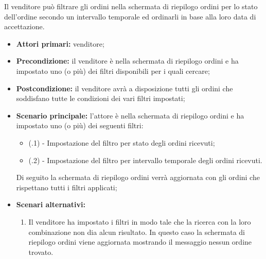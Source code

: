 Il venditore può filtrare gli ordini nella schermata di riepilogo ordini per lo stato dell'ordine secondo un intervallo temporale ed ordinarli in base alla loro data di accettazione.
\begin{itemize}
	\item \textbf{Attori primari:} venditore;
	\item \textbf{Precondizione:} il venditore è nella schermata di riepilogo ordini e ha impostato uno (o più) dei filtri disponibili per i quali cercare;
	\item \textbf{Postcondizione:} il venditore avrà a disposizione tutti gli ordini che soddisfano tutte le condizioni dei vari filtri impostati;
	\item \textbf{Scenario principale:} l'attore è nella schermata di riepilogo ordini e ha impostato uno (o più) dei seguenti filtri:
	\begin{itemize}
		\item (\actualUC.1) - Impostazione del filtro per stato degli ordini ricevuti;
		\item (\actualUC.2) - Impostazione del filtro per intervallo temporale degli ordini ricevuti.
	\end{itemize}
	Di seguito la schermata di riepilogo ordini verrà aggiornata con gli ordini che rispettano tutti i filtri applicati;
	\item \textbf{Scenari alternativi:}
	\begin{enumerate}[label=\lett]
		\item Il venditore ha impostato i filtri in modo tale che la ricerca con la loro combinazione non dia alcun risultato. In questo caso la schermata di riepilogo ordini viene aggiornata mostrando il messaggio nessun ordine trovato.
	\end{enumerate}
\end{itemize}

\resetSubUC


